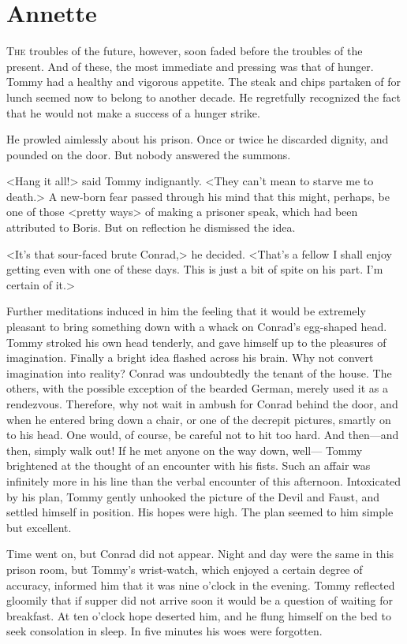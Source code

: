 \chapter{Annette} 

 \lettrine{T}{he} troubles of the future, however, soon faded before the troubles of the present. And of these, the most immediate and pressing was that of hunger. Tommy had a healthy and vigorous appetite. The steak and chips partaken of for lunch seemed now to belong to another decade. He regretfully recognized the fact that he would not make a success of a hunger strike.

He prowled aimlessly about his prison. Once or twice he discarded dignity, and pounded on the door. But nobody answered the summons.

<Hang it all!> said Tommy indignantly. <They can't mean to starve me to death.> A new-born fear passed through his mind that this might, perhaps, be one of those <pretty ways> of making a prisoner speak, which had been attributed to Boris. But on reflection he dismissed the idea.

<It's that sour-faced brute Conrad,> he decided. <That's a fellow I shall enjoy getting even with one of these days. This is just a bit of spite on his part. I'm certain of it.>

Further meditations induced in him the feeling that it would be extremely pleasant to bring something down with a whack on Conrad's egg-shaped head. Tommy stroked his own head tenderly, and gave himself up to the pleasures of imagination. Finally a bright idea flashed across his brain. Why not convert imagination into reality? Conrad was undoubtedly the tenant of the house. The others, with the possible exception of the bearded German, merely used it as a rendezvous. Therefore, why not wait in ambush for Conrad behind the door, and when he entered bring down a chair, or one of the decrepit pictures, smartly on to his head. One would, of course, be careful not to hit too hard. And then—and then, simply walk out! If he met anyone on the way down, well— Tommy brightened at the thought of an encounter with his fists. Such an affair was infinitely more in his line than the verbal encounter of this afternoon. Intoxicated by his plan, Tommy gently unhooked the picture of the Devil and Faust, and settled himself in position. His hopes were high. The plan seemed to him simple but excellent.

Time went on, but Conrad did not appear. Night and day were the same in this prison room, but Tommy's wrist-watch, which enjoyed a certain degree of accuracy, informed him that it was nine o'clock in the evening. Tommy reflected gloomily that if supper did not arrive soon it would be a question of waiting for breakfast. At ten o'clock hope deserted him, and he flung himself on the bed to seek consolation in sleep. In five minutes his woes were forgotten.

